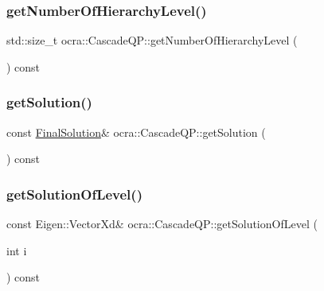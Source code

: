 \hypertarget{classocra_1_1CascadeQP_a1f714b8b6024d46a4e9545324a21e702}{}\label{classocra_1_1CascadeQP_a1f714b8b6024d46a4e9545324a21e702} 
\subsubsection{\texorpdfstring{get\+Number\+Of\+Hierarchy\+Level()}{getNumberOfHierarchyLevel()}}
{\footnotesize\ttfamily std\+::size\+\_\+t ocra\+::\+Cascade\+Q\+P\+::get\+Number\+Of\+Hierarchy\+Level (\begin{DoxyParamCaption}{ }\end{DoxyParamCaption}) const}

\hypertarget{classocra_1_1CascadeQP_af59591ea0fdc81da5866fa3b99fd9d67}{}\label{classocra_1_1CascadeQP_af59591ea0fdc81da5866fa3b99fd9d67} 
\subsubsection{\texorpdfstring{get\+Solution()}{getSolution()}}
{\footnotesize\ttfamily const \hyperlink{structocra_1_1FinalSolution}{Final\+Solution}\& ocra\+::\+Cascade\+Q\+P\+::get\+Solution (\begin{DoxyParamCaption}{ }\end{DoxyParamCaption}) const}

\hypertarget{classocra_1_1CascadeQP_ab897ead27cb45e35281f39d389e8ed87}{}\label{classocra_1_1CascadeQP_ab897ead27cb45e35281f39d389e8ed87} 
\subsubsection{\texorpdfstring{get\+Solution\+Of\+Level()}{getSolutionOfLevel()}}
{\footnotesize\ttfamily const Eigen\+::\+Vector\+Xd\& ocra\+::\+Cascade\+Q\+P\+::get\+Solution\+Of\+Level (\begin{DoxyParamCaption}\item[{int}]{i }\end{DoxyParamCaption}) const}


